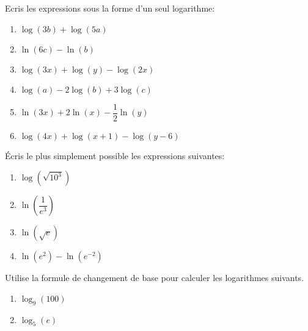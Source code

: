 \documentclass[a4paper,12pt,singlepage]{report}
\begin{document}
\begin{exercice}
Ecris les expressions sous la forme d’un seul logarithme:
\par \setlength{\columnseprule}{0 pt}
          \begin{minipage}[t]{\linewidth}
          \begin{multicols}{2}
\begin{enumerate}
\item \(\log(3b)+\log(5a)\)

\item \(\ln(6c)-\ln(b)\)

\item \(\log(3x)+\log(y)-\log(2x)\)

\item \(\log(a)-2\log(b)+3\log(c)\)

\item \(\ln(3x)+2\ln(x)-\dfrac{1}{2}\ln(y)\)

\item \(\log(4x)+\log(x+1)-\log(y-6)\)
\end{enumerate}



\end{multicols}\end{minipage}
\end{exercice}

\begin{exercice}
Écris le plus simplement possible les expressions suivantes:
\par \setlength{\columnseprule}{0 pt}
          \begin{minipage}[t]{\linewidth}
          \begin{multicols}{2}
\begin{enumerate}
\item \(\log(\sqrt{10^3})\)
\item \(\ln\left(\dfrac{1}{e^3}\right)\)
\item \(\ln(\sqrt{e})\)
\item \(\ln(e^2)-\ln(e^{-2})\)
\end{enumerate}


\end{multicols}\end{minipage}
\end{exercice}

\begin{exercice}
Utilise la formule de changement de base pour calculer les logarithmes suivants.
\par \setlength{\columnseprule}{0 pt}
          \begin{minipage}[t]{\linewidth}
          \begin{multicols}{2}
\begin{enumerate}
\item \(\log_9(100)\)

\item \(\log_5(e)\)
\end{enumerate}


\end{multicols}\end{minipage}
\end{exercice}
\end{document}
